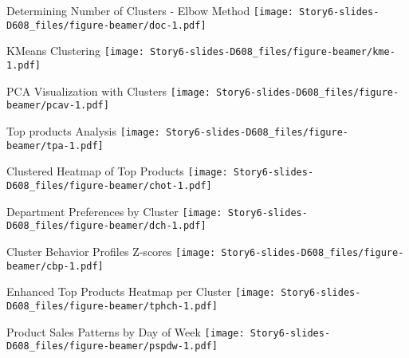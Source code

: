\documentclass[
  ignorenonframetext,
]{beamer}
\begin{document}
\begin{frame}{Determining Number of Clusters - Elbow Method}
\label{determining-number-of-clusters---elbow-method}
\texttt{[image: Story6-slides-D608\_files/figure-beamer/doc-1.pdf]}
\end{frame}

\begin{frame}{KMeans Clustering}
\label{kmeans-clustering}
\texttt{[image: Story6-slides-D608\_files/figure-beamer/kme-1.pdf]}
\end{frame}

\begin{frame}{PCA Visualization with Clusters}
\label{pca-visualization-with-clusters}
\texttt{[image: Story6-slides-D608\_files/figure-beamer/pcav-1.pdf]}
\end{frame}

\begin{frame}{Top products Analysis}
\label{top-products-analysis}
\texttt{[image: Story6-slides-D608\_files/figure-beamer/tpa-1.pdf]}
\end{frame}

\begin{frame}{Clustered Heatmap of Top Products}
\label{clustered-heatmap-of-top-products}
\texttt{[image: Story6-slides-D608\_files/figure-beamer/chot-1.pdf]}
\end{frame}

\begin{frame}{Department Preferences by Cluster}
\label{department-preferences-by-cluster}
\texttt{[image: Story6-slides-D608\_files/figure-beamer/dch-1.pdf]}
\end{frame}

\begin{frame}{Cluster Behavior Profiles Z-scores}
\label{cluster-behavior-profiles-z-scores}
\texttt{[image: Story6-slides-D608\_files/figure-beamer/cbp-1.pdf]}
\end{frame}

\begin{frame}{Enhanced Top Products Heatmap per Cluster}
\label{enhanced-top-products-heatmap-per-cluster}
\texttt{[image: Story6-slides-D608\_files/figure-beamer/tphch-1.pdf]}
\end{frame}

\begin{frame}{Product Sales Patterns by Day of Week}
\label{product-sales-patterns-by-day-of-week}
\texttt{[image: Story6-slides-D608\_files/figure-beamer/pspdw-1.pdf]}
\end{frame}
\end{document}
